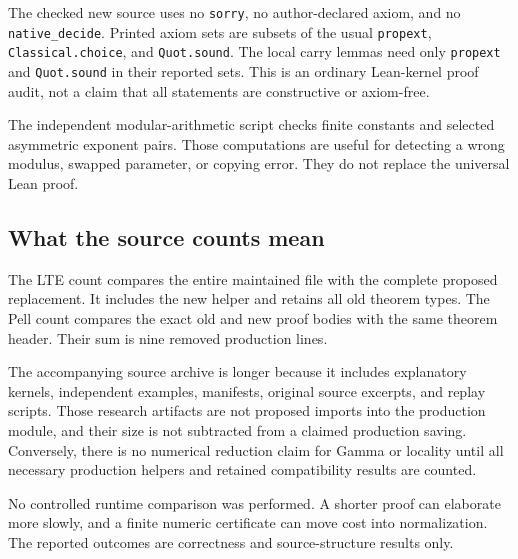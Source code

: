 \documentclass[11pt]{article}
\newcommand{\code}[1]{\nolinkurl{#1}}
\begin{document}
The checked new source uses no \code{sorry}, no author-declared axiom, and no
\code{native_decide}. Printed axiom sets are subsets of the usual
\code{propext}, \code{Classical.choice}, and \code{Quot.sound}. The local carry
lemmas need only \code{propext} and \code{Quot.sound} in their reported sets.
This is an ordinary Lean-kernel proof audit, not a claim that all statements are
constructive or axiom-free.

The independent modular-arithmetic script checks finite constants and selected
asymmetric exponent pairs. Those computations are useful for detecting a wrong
modulus, swapped parameter, or copying error. They do not replace the universal
Lean proof.

\subsection{What the source counts mean}
The LTE count compares the entire maintained file with the complete proposed
replacement. It includes the new helper and retains all old theorem types. The
Pell count compares the exact old and new proof bodies with the same theorem
header. Their sum is nine removed production lines.

The accompanying source archive is longer because it includes explanatory
kernels, independent examples, manifests, original source excerpts, and replay
scripts. Those research artifacts are not proposed imports into the production
module, and their size is not subtracted from a claimed production saving.
Conversely, there is no numerical reduction claim for Gamma or locality until
all necessary production helpers and retained compatibility results are counted.

No controlled runtime comparison was performed. A shorter proof can elaborate
more slowly, and a finite numeric certificate can move cost into normalization.
The reported outcomes are correctness and source-structure results only.
\end{document}

